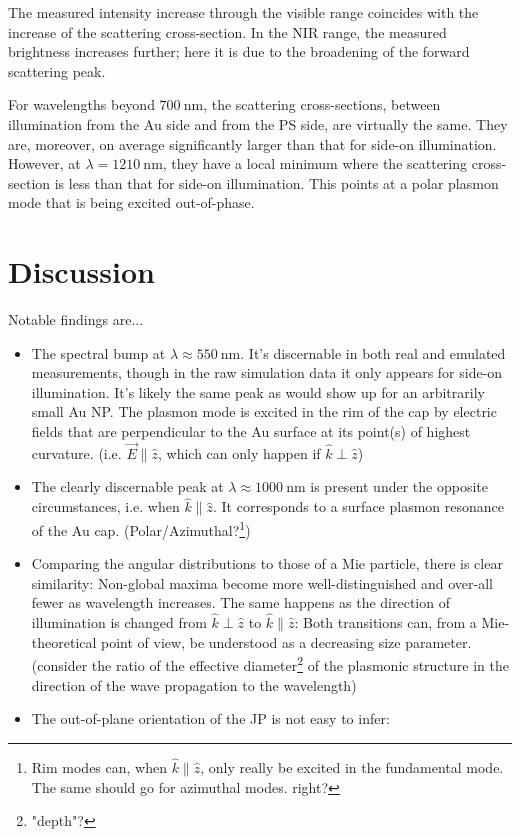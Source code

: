 \documentclass[10pt]{article}
\begin{document}
\begin{multicols}{2}
The measured intensity increase through the visible range coincides with the increase of the scattering cross-section. 
In the NIR range, the measured brightness increases further; here it is due to the broadening of the forward scattering peak. 

For wavelengths beyond $\SI{700}{\nano\meter}$, the scattering cross-sections, between illumination from the Au side and from the PS side, are virtually the same. 
They are, moreover, on average significantly larger than that for side-on illumination. 
However, at $\lambda=\SI{1210}{\nano\meter}$, they have a local minimum where the scattering cross-section is less than that for side-on illumination. 
This points at a polar plasmon mode that is being excited out-of-phase. 






\section*{Discussion}


Notable findings are...
\begin{itemize}
    \item The spectral bump at $\lambda\approx\SI{550}{\nano\meter}$. It's discernable in both real and emulated measurements, though in the raw simulation data it only appears for side-on illumination. 
    It's likely the same peak as would show up for an arbitrarily small Au NP. 
    The plasmon mode is excited in the rim of the cap by electric fields that are perpendicular to the Au surface at its point(s) of highest curvature. (i.e. $\vec{E} \parallel \hat{z}$, which can only happen if $\hat{k} \perp \hat{z}$)
    \item The clearly discernable peak at $\lambda\approx\SI{1000}{\nano\meter}$ is present under the opposite circumstances, i.e. when $\hat{k}\parallel\hat{z}$. 
    It corresponds to a surface plasmon resonance of the Au cap. (Polar/Azimuthal?\footnote{Rim modes can, when $\hat{k}\parallel\hat{z}$, only really be excited in the fundamental mode. The same should go for azimuthal modes. right?})
    \item Comparing the angular distributions to those of a Mie particle, there is clear similarity: 
    Non-global maxima become more well-distinguished and over-all fewer as wavelength increases. 
    The same happens as the direction of illumination is changed from $\hat{k}\perp\hat{z}$ to $\hat{k}\parallel\hat{z}$: Both transitions can, from a Mie-theoretical point of view, be understood as a decreasing size parameter. (consider the ratio of the effective diameter\footnote{"depth"?} of the plasmonic structure in the direction of the wave propagation to the wavelength)  
    \item The out-of-plane orientation of the JP is not easy to infer: 
\end{itemize}



\end{multicols}
\end{document}
